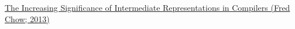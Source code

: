

\begin{frame}{}
  \begin{center}
    \href{https://dl.acm.org/doi/pdf/10.1145/2542661.2544374}{The Increasing Significance of Intermediate Representations in Compilers (Fred Chow; 2013)}
  \end{center}
\end{frame}
